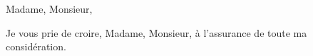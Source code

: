 \documentclass[11pt,a4paper,sans]{moderncv}
\begin{document}





















\date{Strasbourg, le \today} 
\opening{Madame, Monsieur, }
\closing{Je vous prie de croire, Madame, Monsieur, à l'assurance de toute ma considération.} 



\end{document}
